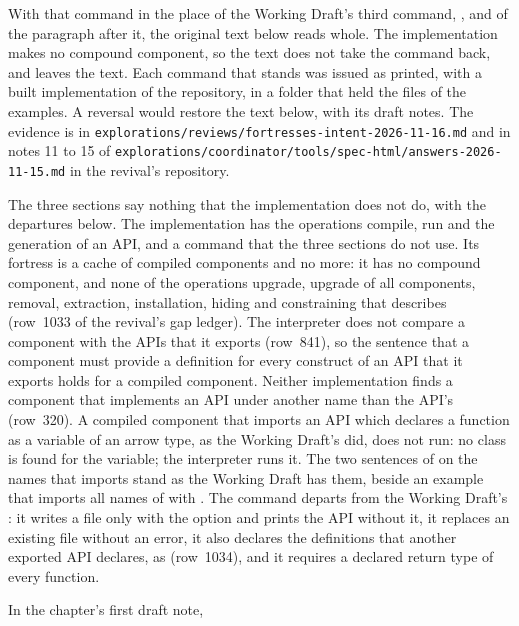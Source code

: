 \begin{description}
\begin{quote}
\end{quote}
With that command in the place of the Working Draft's third command,
, and of the paragraph after it, the original
text below reads whole.
The implementation makes no compound component, so the text does not take
the command back, and  leaves the text.
Each command that stands was issued as printed, with a built implementation
of the repository, in a folder that held the files of the examples.
A reversal would restore the text below, with its draft notes.
The evidence is in
\nolinkurl{explorations/reviews/fortresses-intent-2026-11-16.md} and in notes
11 to 15 of
\nolinkurl{explorations/coordinator/tools/spec-html/answers-2026-11-15.md} in
the revival's repository.
\item[Effect] The three sections say nothing that the implementation does not
do, with the departures below.
The implementation has the operations compile, run and the generation of an
API, and a command  that the three sections do not use.
Its fortress is a cache of compiled components and no more: it has no
compound component, and none of the operations upgrade, upgrade of all
components, removal, extraction, installation, hiding and constraining that
 describes (row~1033 of the revival's gap ledger).
The interpreter does not compare a component with the APIs that it exports
(row~841), so the sentence that a component must provide a definition for
every construct of an API that it exports holds for a compiled component.
Neither implementation finds a component that implements an API under another
name than the API's (row~320).
A compiled component that imports an API which declares a function as a
variable of an arrow type, as the Working Draft's  did, does not
run: no class is found for the variable; the interpreter runs it.
The two sentences of  on the names that 
imports stand as the Working Draft has them, beside an example that imports
all names of  with .
The command  departs from the Working Draft's
: it writes a file only with the option  and
prints the API without it, it replaces an existing file without an error,
it also declares the definitions that another exported API declares, as
 (row~1034), and it requires a declared return type of every
function.
\item[Original text] In the chapter's first draft note,

\end{description}
